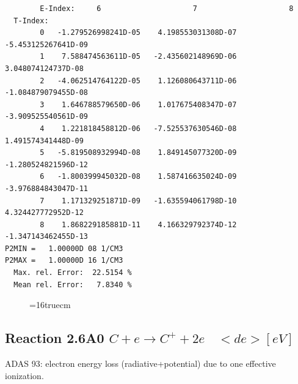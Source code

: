 \documentclass[12pt,dvipdfmx]{article}
\begin{document}
\begin{small}
\begin{verbatim}
        E-Index:     6                     7                     8
  T-Index:
        0   -1.279526998241D-05    4.198553031308D-07   -5.453125267641D-09
        1    7.588474563611D-05   -2.435602148969D-06    3.048074124737D-08
        2   -4.062514764122D-05    1.126080643711D-06   -1.084879079455D-08
        3    1.646788579650D-06    1.017675408347D-07   -3.909525540561D-09
        4    1.221818458812D-06   -7.525537630546D-08    1.491574341448D-09
        5   -5.819508932994D-08    1.849145077320D-09   -1.280524821596D-12
        6   -1.800399945032D-08    1.587416635024D-09   -3.976884843047D-11
        7    1.171329251871D-09   -1.635594061798D-10    4.324427772952D-12
        8    1.868229185881D-11    4.166329792374D-12   -1.347143462455D-13
P2MIN =   1.00000D 08 1/CM3
P2MAX =   1.00000D 16 1/CM3
  Max. rel. Error:  22.5154 %
  Mean rel. Error:   7.8340 %

\end{verbatim}\end{small}
\begin{figure} \label{2.3.13aec}
\epsfxsize=16truecm
\end{figure}
\newpage


\subsection{
  Reaction 2.6A0 $C  + e \rightarrow C^+   + 2e $ \ $<de> [eV] $
}
ADAS 93:
  electron energy loss (radiative+potential) due to one effective ionization.
\end{document}
